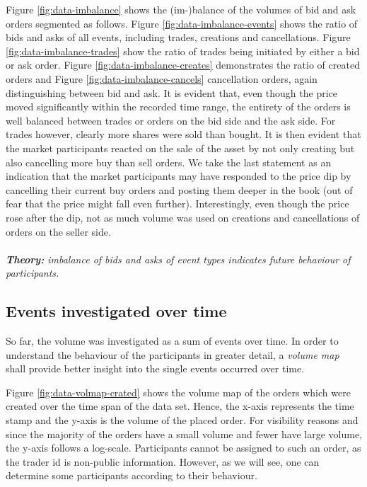 Figure \ref{fig:data-imbalance} shows the (im-)balance of the volumes of bid and ask orders segmented as follows.
Figure \ref{fig:data-imbalance-events} shows the ratio of bids and asks of all events, including trades, creations and cancellations. 
Figure \ref{fig:data-imbalance-trades} show the ratio of trades being initiated by either a bid or ask order.
Figure \ref{fig:data-imbalance-creates} demonstrates the ratio of created orders and Figure \ref{fig:data-imbalance-cancels} cancellation orders, again distinguishing between bid and ask.
It is evident that, even though the price moved significantly within the recorded time range, the entirety of the orders is well balanced between trades or orders on the bid side and the ask side.
For trades however, clearly more shares were sold than bought.
It is then evident that the market participants reacted on the sale of the asset by not only creating but also cancelling more buy than sell orders.
We take the last statement as an indication that the market participants may have responded to the price dip by cancelling their current buy orders and posting them deeper in the book (out of fear that the price might fall even further).
Interestingly, even though the price rose after the dip, not as much volume was used on creations and cancellations of orders on the seller side.
\\
\\
\textit{\textbf{Theory:} imbalance of bids and asks of event types indicates future behaviour of participants.}

\subsection{Events investigated over time}

So far, the volume was investigated as a sum of events over time.
In order to understand the behaviour of the participants in greater detail, a \textit{volume map} shall provide better insight into the single events occurred over time.

Figure \ref{fig:data-volmap-crated} shows the volume map of the orders which were created over the time span of the data set.
Hence, the x-axis represents the time stamp and the y-axis is the volume of the placed order.
For visibility reasons and since the majority of the orders have a small volume and fewer have large volume, the y-axis follows a log-scale.
Participants cannot be assigned to such an order, as the trader id is non-public information.
However, as we will see, one can determine some participants according to their behaviour.

